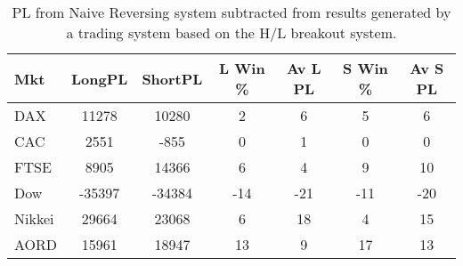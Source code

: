 \begin{table}[ht]
\centering
\caption[H/L breakout system results minus Naive Reversing results]{PL from Naive Reversing system subtracted from results generated by a trading system based on the H/L breakout system.} 
\label{tab:hl_bout_sys_diff}
\begin{tabular}{lcccccc}
  \toprule Mkt & LongPL & ShortPL & L Win \% & Av L PL & S Win \% & Av S PL \\ 
  \midrule DAX & 11278 & 10280 & 2 & 6 & 5 & 6 \\ 
  CAC & 2551 & -855 & 0 & 1 & 0 & 0 \\ 
  FTSE & 8905 & 14366 & 6 & 4 & 9 & 10 \\ 
  Dow & -35397 & -34384 & -14 & -21 & -11 & -20 \\ 
  Nikkei & 29664 & 23068 & 6 & 18 & 4 & 15 \\ 
  AORD & 15961 & 18947 & 13 & 9 & 17 & 13 \\ 
   \bottomrule \end{tabular}
\end{table}
